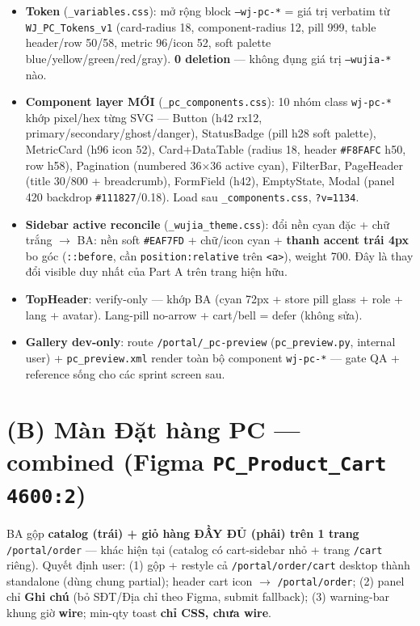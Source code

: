 \begin{itemize}
  \item \textbf{Token} (\texttt{\_variables.css}): mở rộng block \texttt{--wj-pc-*} = giá trị verbatim
        từ \texttt{WJ\_PC\_Tokens\_v1} (card-radius 18, component-radius 12, pill 999, table header/row
        50/58, metric 96/icon 52, soft palette blue/yellow/green/red/gray). \textbf{0 deletion} ---
        không đụng giá trị \texttt{--wujia-*} nào.
  \item \textbf{Component layer MỚI} (\texttt{\_pc\_components.css}): 10 nhóm class \texttt{wj-pc-*}
        khớp pixel/hex từng SVG --- Button (h42 rx12, primary/secondary/ghost/danger), StatusBadge
        (pill h28 soft palette), MetricCard (h96 icon 52), Card+DataTable (radius 18, header
        \texttt{\#F8FAFC} h50, row h58), Pagination (numbered 36×36 active cyan), FilterBar, PageHeader
        (title 30/800 + breadcrumb), FormField (h42), EmptyState, Modal (panel 420 backdrop
        \texttt{\#111827}/0.18). Load sau \texttt{\_components.css}, \texttt{?v=1134}.
  \item \textbf{Sidebar active reconcile} (\texttt{\_wujia\_theme.css}): đổi nền cyan đặc + chữ trắng
        \(\rightarrow\) BA: nền soft \texttt{\#EAF7FD} + chữ/icon cyan + \textbf{thanh accent trái 4px}
        bo góc (\texttt{::before}, cần \texttt{position:relative} trên \texttt{<a>}), weight 700. Đây là
        thay đổi visible duy nhất của Part A trên trang hiện hữu.
  \item \textbf{TopHeader}: verify-only --- khớp BA (cyan 72px + store pill glass + role + lang +
        avatar). Lang-pill no-arrow + cart/bell = defer (không sửa).
  \item \textbf{Gallery dev-only}: route \texttt{/portal/\_pc-preview} (\texttt{pc\_preview.py}, internal
        user) + \texttt{pc\_preview.xml} render toàn bộ component \texttt{wj-pc-*} --- gate QA + reference
        sống cho các sprint screen sau.
\end{itemize}

\section{(B) Màn Đặt hàng PC --- combined (Figma \texttt{PC\_Product\_Cart 4600:2})}

BA gộp \textbf{catalog (trái) + giỏ hàng ĐẦY ĐỦ (phải) trên 1 trang} \texttt{/portal/order} --- khác
hiện tại (catalog có cart-sidebar nhỏ + trang \texttt{/cart} riêng). Quyết định user: (1) gộp +
restyle cả \texttt{/portal/order/cart} desktop thành standalone (dùng chung partial); header cart icon
\(\rightarrow\) \texttt{/portal/order}; (2) panel chỉ \textbf{Ghi chú} (bỏ SĐT/Địa chỉ theo Figma,
submit fallback); (3) warning-bar khung giờ \textbf{wire}; min-qty toast \textbf{chỉ CSS, chưa wire}.

